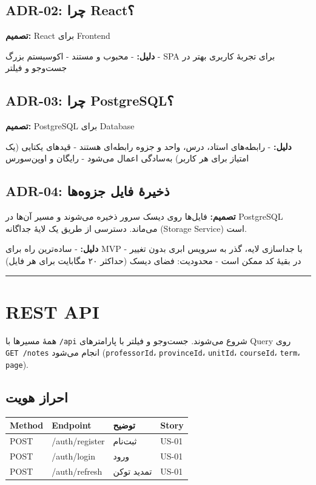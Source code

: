 \documentclass[12pt, a4paper]{article}
\begin{document}
\subsection{ADR-02: چرا React؟}

\textbf{تصمیم:} React برای Frontend

\textbf{دلیل:}
- محبوب و مستند
- اکوسیستم بزرگ
- SPA برای تجربهٔ کاربری بهتر در جست‌وجو و فیلتر

\subsection{ADR-03: چرا PostgreSQL؟}

\textbf{تصمیم:} PostgreSQL برای Database

\textbf{دلیل:}
- رابطه‌های استاد، درس، واحد و جزوه رابطه‌ای هستند
- قیدهای یکتایی (یک امتیاز برای هر کاربر) به‌سادگی اعمال می‌شود
- رایگان و اوپن‌سورس

\subsection{ADR-04: ذخیرهٔ فایل جزوه‌ها}

\textbf{تصمیم:} فایل‌ها روی دیسک سرور ذخیره می‌شوند و مسیر آن‌ها در PostgreSQL می‌ماند. دسترسی از طریق یک لایهٔ جداگانه (Storage Service) است.

\textbf{دلیل:}
- ساده‌ترین راه برای MVP
- با جداسازی لایه، گذر به سرویس ابری بدون تغییر در بقیهٔ کد ممکن است
- محدودیت: فضای دیسک (حداکثر ۲۰ مگابایت برای هر فایل)

\begin{center}\rule{0.5\linewidth}{0.5pt}\end{center}

\section{REST API}

همهٔ مسیرها با \texttt{/api} شروع می‌شوند. جست‌وجو و فیلتر با پارامترهای Query روی \texttt{GET\ /notes} انجام می‌شود
(\texttt{professorId}، \texttt{provinceId}، \texttt{unitId}، \texttt{courseId}، \texttt{term}، \texttt{page}).

\subsection{احراز هویت}

\begin{longtable}[]{@{}llll@{}}
\toprule\noalign{}
Method & Endpoint & توضیح & Story \\
\midrule\noalign{}
\endhead
\bottomrule\noalign{}
\endlastfoot
POST & /auth/register & ثبت‌نام & US-01 \\
POST & /auth/login & ورود & US-01 \\
POST & /auth/refresh & تمدید توکن & US-01 \\
\end{longtable}
\end{document}
